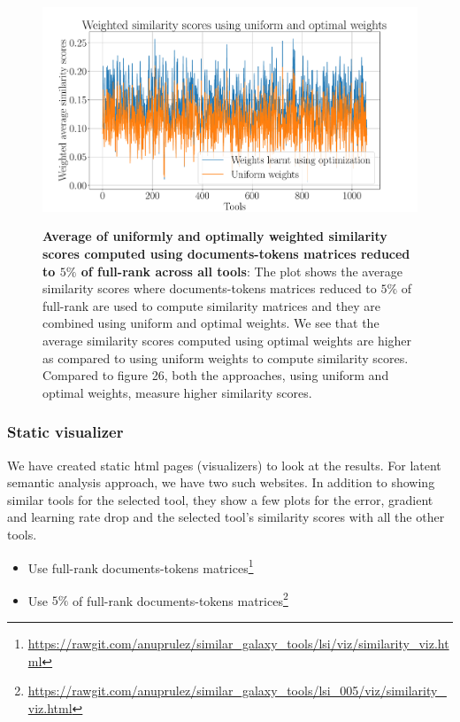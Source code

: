 \begin{figure}[h]
\begin{centering}
    {\includegraphics[scale=0.4]{figures/Optimization_005_lsi.pdf}}
    \caption[Average of uniformly and optimally weighted similarity scores computed using documents-tokens matrices reduced to $5\%$ of full-rank across all tools]{\textbf{Average of uniformly and optimally weighted similarity scores computed using documents-tokens matrices reduced to $5\%$ of full-rank across all tools}: The plot shows the average similarity scores where documents-tokens matrices reduced to $5\%$ of full-rank are used to compute similarity matrices and they are combined using uniform and optimal weights. We see that the average similarity scores computed using optimal weights are higher as compared to using uniform weights to compute similarity scores. Compared to figure 26, both the approaches, using uniform and optimal weights, measure higher similarity scores. }
\end{centering}
\end{figure}

\subsubsection{Static visualizer}
We have created static html pages (visualizers) to look at the results. For latent semantic analysis approach, we have two such websites. In addition to showing similar tools for the selected tool, they show a few plots for the error, gradient and learning rate drop and the selected tool's similarity scores with all the other tools.

\begin{itemize}
\item Use full-rank documents-tokens matrices\footnote{\url{https://rawgit.com/anuprulez/similar_galaxy_tools/lsi/viz/similarity_viz.html}}
\item Use $5\%$ of full-rank documents-tokens matrices\footnote{\url{https://rawgit.com/anuprulez/similar_galaxy_tools/lsi_005/viz/similarity_viz.html}}
\end{itemize}

